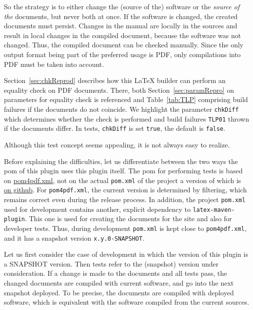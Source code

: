 So the strategy is to either change the (source of the) software 
or the \emph{source of the} documents, but never both at once. 
If the software is changed, the created documents must persist. 
Changes in the manual are locally in the sources 
and result in local changes in the compiled document, 
because the software was not changed. 
Thus, the compiled document can be checked manually. 
Since the only output format being part of the preferred usage is PDF, 
only compilations into PDF must be taken into account. 

Section~\ref{sec:chkReprod} describes how this \LaTeX{} builder 
can perform an equality check on PDF documents. 
There, both Section~\ref{sec:paramRepro} on parameters for equality check is referenced 
and Table~\ref{tab:TLP} comprising build failures if the documents do not coincide. 
We highlight the parameter \texttt{chkDiff} which determines whether the check is performed 
and build failures \texttt{TLP01} thrown if the documents differ. 
In tests, \texttt{chkDiff} is set \texttt{true}, the default is \texttt{false}. 
\medskip


Although this test concept seems appealing, 
it is not always easy to realize. 

Before explaining the difficulties, let us differentiate between the two ways 
the pom of this plugin uses this plugin itself. 
The pom for performing tests 
is based on \href{\urlSite fromMain/pom4pdf.xml}{pom4pdf.xml}, 
not on the actual \texttt{pom.xml} of the project 
a version of which is 
\href{https://github.com/Reissner/latex-maven-plugin/tree/master/maven-latex-plugin}%
{on github}. 
For \texttt{pom4pdf.xml}, the current version is determined by filtering, 
which remains correct even during the release process. 
In addition, the project \texttt{pom.xml} used for development 
contains another, explicit dependency to \texttt{latex-maven-plugin}. 
This one is used for creating the documents for the site 
and also for developer tests. 
Thus, during development \texttt{pom.xml} is kept close to \texttt{pom4pdf.xml}, 
and it has a snapshot version \texttt{x.y.0-SNAPSHOT}. 

Let us first consider the case of development 
in which the version of this plugin is a SNAPSHOT version. 
Then tests refer to the (snapshot) version under consideration. 
If a change is made to the documents and all tests pass, 
the changed documents are compiled with current software, 
and go into the next snapshot deployed. 
To be precise, the documents are compiled with deployed software, 
which is equivalent with the software compiled from the current sources. 


